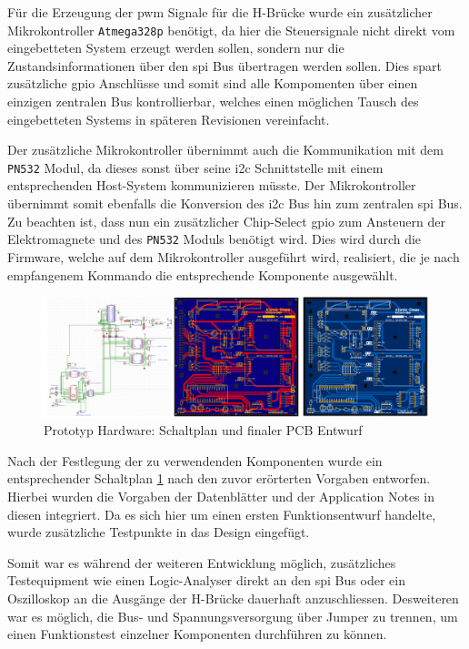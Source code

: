 Für die Erzeugung der \gls{pwm} Signale für die H-Brücke wurde ein
zusätzlicher Mikrokontroller \passthrough{\lstinline!Atmega328p!}
benötigt, da hier die Steuersignale nicht direkt vom eingebetteten
System erzeugt werden sollen, sondern nur die Zustandsinformationen über
den \gls{spi} Bus übertragen werden sollen. Dies spart zusätzliche
\gls{gpio} Anschlüsse und somit sind alle Kompomenten über einen
einzigen zentralen Bus kontrollierbar, welches einen möglichen Tausch
des eingebetteten Systems in späteren Revisionen vereinfacht.

Der zusätzliche Mikrokontroller übernimmt auch die Kommunikation mit dem
\passthrough{\lstinline!PN532!} Modul, da dieses sonst über seine
\gls{i2c} Schnittstelle mit einem entsprechenden Host-System
kommunizieren müsste. Der Mikrokontroller übernimmt somit ebenfalls die
Konversion des \gls{i2c} Bus hin zum zentralen \gls{spi} Bus. Zu
beachten ist, dass nun ein zusätzlicher Chip-Select \gls{gpio} zum
Ansteuern der Elektromagnete und des \passthrough{\lstinline!PN532!}
Moduls benötigt wird. Dies wird durch die Firmware, welche auf dem
Mikrokontroller ausgeführt wird, realisiert, die je nach empfangenem
Kommando die entsprechende Komponente ausgewählt.

\begin{figure}
\centering
\includegraphics{images/ATC_DK_HW_SCHEM.png}
\caption{Prototyp Hardware: Schaltplan und finaler PCB Entwurf
\label{ATC_Schematic_DK}}
\end{figure}

Nach der Festlegung der zu verwendenden Komponenten wurde ein
entsprechender Schaltplan \ref{ATC_Schematic_DK} nach den zuvor
erörterten Vorgaben entworfen. Hierbei wurden die Vorgaben der
Datenblätter und der Application Notes in diesen integriert. Da es sich
hier um einen ersten Funktionsentwurf handelte, wurde zusätzliche
Testpunkte in das Design eingefügt.

Somit war es während der weiteren Entwicklung möglich, zusätzliches
Testequipment wie einen Logic-Analyser direkt an den \gls{spi} Bus oder
ein Oszilloskop an die Ausgänge der H-Brücke dauerhaft anzuschliessen.
Desweiteren war es möglich, die Bus- und Spannungsversorgung über Jumper
zu trennen, um einen Funktionstest einzelner Komponenten durchführen zu
können.

